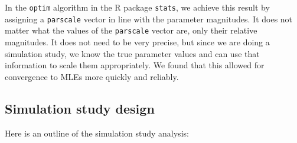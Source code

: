 \documentclass[
]{article}
\begin{document}
In the \texttt{optim} algorithm in the R package \texttt{stats}, we
achieve this result by assigning a \texttt{parscale} vector in line with
the parameter magnitudes. It does not matter what the values of the
\texttt{parscale} vector are, only their relative magnitudes. It does
not need to be very precise, but since we are doing a simulation study,
we know the true parameter values and can use that information to scale
them appropriately. We found that this allowed for convergence to MLEs
more quickly and reliably.

\hypertarget{simulation-study-design}{%
\subsection{Simulation study design}\label{simulation-study-design}}

Here is an outline of the simulation study analysis:
\end{document}
